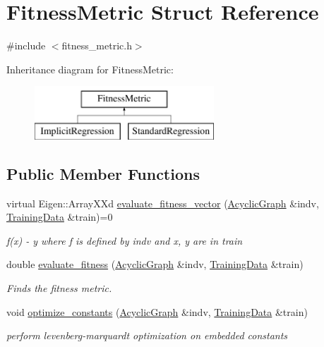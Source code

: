 \hypertarget{structFitnessMetric}{}\section{Fitness\+Metric Struct Reference}
\label{structFitnessMetric}


{\ttfamily \#include $<$fitness\+\_\+metric.\+h$>$}

Inheritance diagram for Fitness\+Metric\+:\begin{figure}[H]
\begin{center}
\leavevmode
\includegraphics[height=2.000000cm]{structFitnessMetric}
\end{center}
\end{figure}
\subsection*{Public Member Functions}
\begin{DoxyCompactItemize}
\item 
virtual Eigen\+::\+Array\+X\+Xd \hyperlink{structFitnessMetric_a17bf921d3200dc93493e2af5c38552ad}{evaluate\+\_\+fitness\+\_\+vector} (\hyperlink{classAcyclicGraph}{Acyclic\+Graph} \&indv, \hyperlink{structTrainingData}{Training\+Data} \&train)=0
\begin{DoxyCompactList}\small\item\em f(x) -\/ y where f is defined by indv and x, y are in train \end{DoxyCompactList}\item 
double \hyperlink{structFitnessMetric_a8af896d7e25e1bf34412ce92b4851958}{evaluate\+\_\+fitness} (\hyperlink{classAcyclicGraph}{Acyclic\+Graph} \&indv, \hyperlink{structTrainingData}{Training\+Data} \&train)
\begin{DoxyCompactList}\small\item\em Finds the fitness metric. \end{DoxyCompactList}\item 
void \hyperlink{structFitnessMetric_ae4e27aefef6b54dddd6052bd80d37665}{optimize\+\_\+constants} (\hyperlink{classAcyclicGraph}{Acyclic\+Graph} \&indv, \hyperlink{structTrainingData}{Training\+Data} \&train)
\begin{DoxyCompactList}\small\item\em perform levenberg-\/marquardt optimization on embedded constants \end{DoxyCompactList}\end{DoxyCompactItemize}


